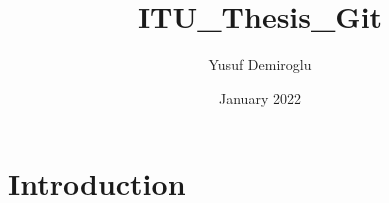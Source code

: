 \documentclass{article}
\title{ITU_Thesis_Git}
\author{Yusuf Demiroglu}
\date{January 2022}
\begin{document}
\maketitle

\section{Introduction}
\end{document}
